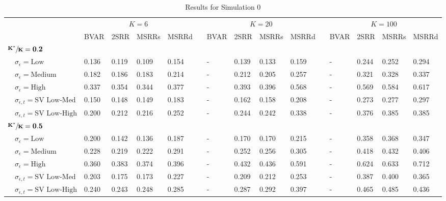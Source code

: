 \begin{table}[!tbp]
\caption{Results for Simulation 0\label{s1_table}} 
\begin{center}
\begin{tabular}{lllllcllllcllll}
\hline\hline
\multicolumn{1}{l}{\bfseries }&\multicolumn{4}{c}{\bfseries $K=6$}&\multicolumn{1}{c}{\bfseries }&\multicolumn{4}{c}{\bfseries $K=20$}&\multicolumn{1}{c}{\bfseries }&\multicolumn{4}{c}{\bfseries $K=100$}\tabularnewline
\cline{2-5} \cline{7-10} \cline{12-15}
\multicolumn{1}{l}{}&\multicolumn{1}{c}{BVAR}&\multicolumn{1}{c}{2SRR}&\multicolumn{1}{c}{MSRRs}&\multicolumn{1}{c}{MSRRd}&\multicolumn{1}{c}{}&\multicolumn{1}{c}{BVAR}&\multicolumn{1}{c}{2SRR}&\multicolumn{1}{c}{MSRRs}&\multicolumn{1}{c}{MSRRd}&\multicolumn{1}{c}{}&\multicolumn{1}{c}{BVAR}&\multicolumn{1}{c}{2SRR}&\multicolumn{1}{c}{MSRRs}&\multicolumn{1}{c}{MSRRd}\tabularnewline
\hline
{\bfseries $\mathbf{\sfrac{K^*}{K}=0.2}$}&&&&&&&&&&&&&&\tabularnewline
~~$\sigma_{\epsilon} =\text{Low}$& 0.136& 0.119& 0.109& 0.154&&-& 0.139& 0.133& 0.159&&-& 0.244& 0.252& 0.294\tabularnewline
~~$\sigma_{\epsilon} =\text{Medium}$& 0.182& 0.186& 0.183& 0.214&&-& 0.212& 0.205& 0.257&&-& 0.321& 0.328& 0.337\tabularnewline
~~$\sigma_{\epsilon} =\text{High}$& 0.337& 0.354& 0.344& 0.377&&-& 0.393& 0.396& 0.568&&-& 0.569& 0.584& 0.617\tabularnewline
~~$\sigma_{\epsilon,t} = \text{SV Low-Med}$& 0.150& 0.148& 0.149& 0.183&&-& 0.162& 0.158& 0.208&&-& 0.273& 0.277& 0.297\tabularnewline
~~$\sigma_{\epsilon,t}  = \text{SV Low-High}$& 0.200& 0.212& 0.216& 0.252&&-& 0.244& 0.242& 0.338&&-& 0.376& 0.385& 0.385\tabularnewline
\hline
{\bfseries $\mathbf{\sfrac{K^*}{K}=0.5}$}&&&&&&&&&&&&&&\tabularnewline
~~$\sigma_{\epsilon} =\text{Low}$& 0.200& 0.142& 0.136& 0.187&&-& 0.170& 0.170& 0.215&&-& 0.358& 0.368& 0.347\tabularnewline
~~$\sigma_{\epsilon} =\text{Medium}$& 0.228& 0.219& 0.222& 0.291&&-& 0.252& 0.256& 0.305&&-& 0.418& 0.432& 0.406\tabularnewline
~~$\sigma_{\epsilon} =\text{High}$& 0.360& 0.383& 0.374& 0.396&&-& 0.432& 0.436& 0.591&&-& 0.624& 0.633& 0.712\tabularnewline
~~$\sigma_{\epsilon,t} = \text{SV Low-Med}$& 0.203& 0.175& 0.173& 0.227&&-& 0.209& 0.212& 0.253&&-& 0.387& 0.400& 0.365\tabularnewline
~~$\sigma_{\epsilon,t}  = \text{SV Low-High}$& 0.240& 0.243& 0.248& 0.285&&-& 0.287& 0.292& 0.397&&-& 0.465& 0.485& 0.436\tabularnewline

\end{tabular}
\end{center}
\end{table}
